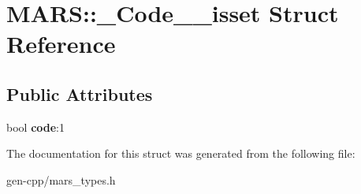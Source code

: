 \hypertarget{structMARS_1_1__Code____isset}{}\section{M\+A\+RS\+:\+:\+\_\+\+Code\+\_\+\+\_\+isset Struct Reference}
\label{structMARS_1_1__Code____isset}
\subsection*{Public Attributes}
\begin{DoxyCompactItemize}
\item 
\mbox{\label{structMARS_1_1__Code____isset_a55fe63d95f3bc487fd158831e11aad88}} 
bool {\bfseries code}\+:1
\end{DoxyCompactItemize}


The documentation for this struct was generated from the following file\+:\begin{DoxyCompactItemize}
\item 
gen-\/cpp/mars\+\_\+types.\+h\end{DoxyCompactItemize}
